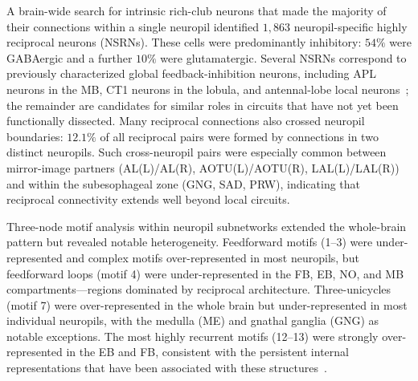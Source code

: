 \documentclass[11pt]{article}
\begin{document}
A brain-wide search for intrinsic rich-club neurons that made the majority
of their connections within a single neuropil identified $1{,}863$
neuropil-specific highly reciprocal neurons (NSRNs). These cells were
predominantly inhibitory: $54\%$ were GABAergic and a further $10\%$ were
glutamatergic. Several NSRNs correspond to previously characterized
global feedback-inhibition neurons, including APL neurons in the MB, CT1
neurons in the lobula, and antennal-lobe local neurons~\cite{amin2020inhibitory,takemura2017complete};
the remainder are candidates for similar roles in circuits that have not
yet been functionally dissected. Many reciprocal connections also crossed
neuropil boundaries: $12.1\%$ of all reciprocal pairs were formed by
connections in two distinct neuropils. Such cross-neuropil pairs were
especially common between mirror-image partners (AL(L)/AL(R),
AOTU(L)/AOTU(R), LAL(L)/LAL(R)) and within the subesophageal zone (GNG,
SAD, PRW), indicating that reciprocal connectivity extends well beyond
local circuits.

Three-node motif analysis within neuropil subnetworks extended the
whole-brain pattern but revealed notable heterogeneity. Feedforward
motifs (1--3) were under-represented and complex motifs over-represented
in most neuropils, but feedforward loops (motif 4) were under-represented
in the FB, EB, NO, and MB compartments---regions dominated by reciprocal
architecture. Three-unicycles (motif 7) were over-represented in the
whole brain but under-represented in most individual neuropils, with the
medulla (ME) and gnathal ganglia (GNG) as notable exceptions. The most
highly recurrent motifs (12--13) were strongly over-represented in the EB
and FB, consistent with the persistent internal representations that have
been associated with these structures~\cite{seelig2015neural,hulse2021connectome}.
\end{document}
